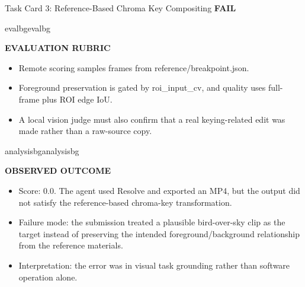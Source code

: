 \documentclass{llmxive}
\providecommand{\StatusBadge}[3]{\begingroup\setlength{\fboxsep}{3pt}\colorbox{#2}{\textbf{#1}}\endgroup}
\providecommand{\BlockTitle}[1]{{\raggedright\textbf{\footnotesize #1}\par}\vspace{2pt}}
\begin{document}
\begin{ColorTaskCard}{Task Card 3: Reference-Based Chroma Key Compositing \hfill \StatusBadge{FAIL}{failbg}{failred}}
\begin{minipage}[t]{0.49\linewidth}
\end{minipage}\hfill
\begin{minipage}[t]{0.49\linewidth}
\vspace{0pt}
\begin{CardBlock}{evalbg}{evalbg}
\BlockTitle{EVALUATION RUBRIC}
\begin{itemize}
\item Remote scoring samples frames from reference/breakpoint.json.
\item Foreground preservation is gated by roi\_input\_cv, and quality uses full-frame plus ROI edge IoU.
\item A local vision judge must also confirm that a real keying-related edit was made rather than a raw-source copy.
\end{itemize}
\end{CardBlock}

\begin{CardBlock}{analysisbg}{analysisbg}
\BlockTitle{OBSERVED OUTCOME}
\begin{itemize}
\item Score: 0.0. The agent used Resolve and exported an MP4, but the output did not satisfy the reference-based chroma-key transformation.
\item Failure mode: the submission treated a plausible bird-over-sky clip as the target instead of preserving the intended foreground/background relationship from the reference materials.
\item Interpretation: the error was in visual task grounding rather than software operation alone.
\end{itemize}
\end{CardBlock}
\end{minipage}
\end{ColorTaskCard}
\end{document}
